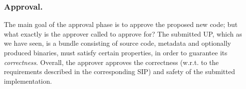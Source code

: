 \subsubsection{Approval.}



The main goal of the approval phase is to approve the proposed new code; but 
what exactly is the approver called to approve for? The submitted UP, which as 
we have seen, is a bundle consisting of source code, metadata and optionally 
produced binaries, must satisfy certain properties, in order to guarantee its 
\emph{correctness}. Overall, the approver approves the correctness (w.r.t. to 
the requirements described in the corresponding SIP) and safety of the 
submitted implementation. 




